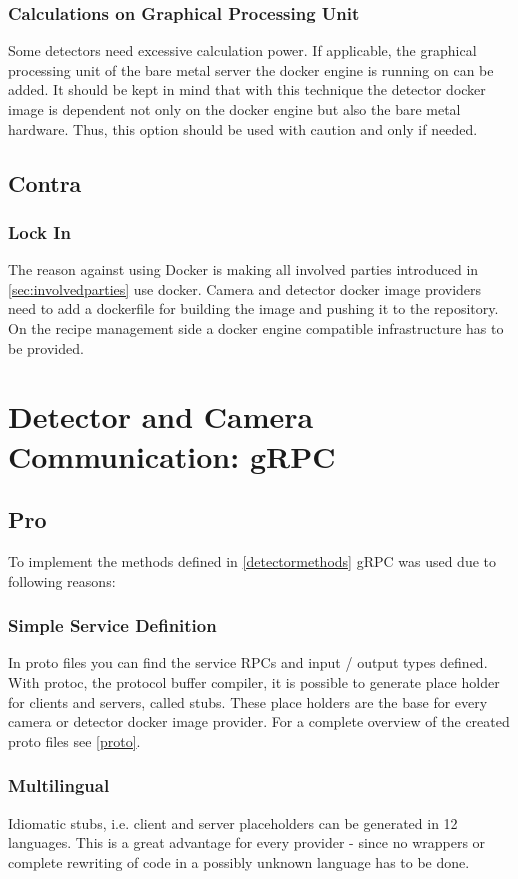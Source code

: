  \subsubsection{Calculations on Graphical Processing Unit}
 Some detectors need excessive calculation power. If applicable, the graphical processing unit of the bare metal server the docker engine is running on can be added. It should be kept in mind that with this technique the detector docker image is dependent not only on the docker engine but also the bare metal hardware. Thus, this option should be used with caution and only if needed.
\subsection{Contra}
\subsubsection{Lock In}
The reason against using Docker is making all involved parties introduced in \ref{sec:involvedparties} use docker. Camera and detector docker image providers need to add a dockerfile for building the image and pushing it to the repository. On the recipe management side a docker engine compatible infrastructure has to be provided. 

\section{Detector and Camera Communication: gRPC}
\subsection{Pro}
To implement the methods defined in \ref{detectormethods} gRPC was used due to following reasons: 
\subsubsection{Simple Service Definition}
In proto files you can find the service RPCs and input / output types defined. With protoc, the protocol buffer compiler, it is possible to generate place holder for clients and servers, called stubs. These place holders are the base for every camera or detector docker image provider. For a complete overview of the created proto files see \ref{proto}. 
\subsubsection{Multilingual}
Idiomatic stubs, i.e. client and server placeholders can be generated in 12 languages.\cite{LastvisitedMay4th20192019GRPCDocumentation} This is a great advantage for every provider - since no wrappers or complete rewriting of code in a possibly unknown language has to be done.
